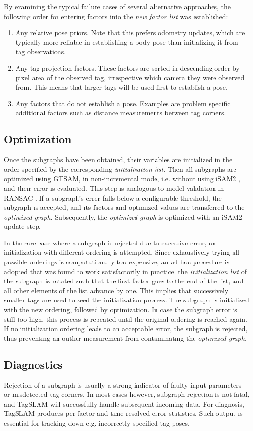 By examining the typical failure cases of several alternative
approaches, the following order for entering factors into the {\em new
  factor list} was established:
\begin{enumerate}[wide, labelwidth=!]
\item Any relative pose priors. Note that this prefers odometry
  updates, which are typically more reliable in establishing a body
  pose than initializing it from tag observations.
\item Any tag projection factors. These factors are sorted in
  descending order by pixel area of the observed tag, irrespective
  which camera they were observed from. This means that larger tags
  will be used first to establish a pose.
\item Any factors that do not establish a pose. Examples are problem
  specific additional factors such as distance measurements between
  tag corners.
\end{enumerate}

\subsection{Optimization}
Once the subgraphs have been obtained, their variables are initialized
in the order specified by the corresponding {\em initialization
  list}. Then all subgraphs are optimized using GTSAM, in
non-incremental mode, i.e. without using iSAM2 \cite{kaess2011}, and
their error is evaluated. This step is analogous to model validation
in RANSAC \cite{fischler1981}. If a subgraph's error falls below a
configurable threshold, the subgraph is accepted, and its factors and
optimized values are transferred to the {\em optimized
  graph}. Subsequently, the {\em optimized graph} is optimized with an
iSAM2 update step.

In the rare case where a subgraph is rejected due to excessive error,
an initialization with different ordering is attempted. Since
exhaustively trying all possible orderings is computationally too
expensive, an ad hoc procedure is adopted that was found to work
satisfactorily in practice: the {\em initialization list} of the
subgraph is rotated such that the first factor goes to the end of the
list, and all other elements of the list advance by one. This implies
that successively smaller tags are used to seed the initialization
process. The subgraph is initialized with the new ordering, followed
by optimization. In case the subgraph error is still too high, this
process is repeated until the original ordering is reached again. If
no initialization ordering leads to an acceptable error, the subgraph
is rejected, thus preventing an outlier measurement from contaminating
the {\em optimized graph}.

\subsection{Diagnostics}
Rejection of a subgraph is usually a strong indicator of faulty input
parameters or misdetected tag corners. In most cases however, subgraph
rejection is not fatal, and TagSLAM will successfully handle
subsequent incoming data. For diagnosis, TagSLAM produces per-factor
and time resolved error statistics. Such output is essential for
tracking down e.g. incorrectly specified tag poses.
